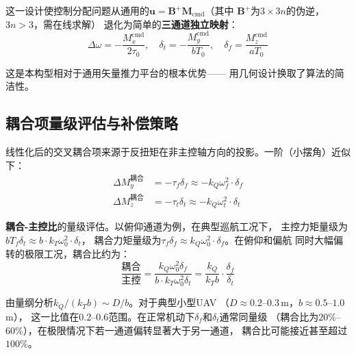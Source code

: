 \documentclass[a4paper,12pt]{ctexart}
\theoremstyle{plain}
\theoremstyle{definition}
\begin{document}
这一设计使控制分配问题从通用的$\bm{u} = \bm{B}^+ \bm{M}_{\text{cmd}}$（其中
$\bm{B}^+$为$3 \times 3n$的伪逆，$3n > 3$，需在线求解）
退化为简单的\textbf{三通道独立映射}：
\begin{equation}
    \Delta\omega = -\frac{M_x^{\text{cmd}}}{2\tau_0}, \quad
    \delta_t = -\frac{M_y^{\text{cmd}}}{b T_0}, \quad
    \delta_f = \frac{M_z^{\text{cmd}}}{a T_0}
    \label{eq:direct_mapping}
\end{equation}

这是本构型相对于通用矢量推力平台的根本优势——
用几何设计换取了算法的简洁性\cite{johansen2013control,oppenheimer2010control}。

\subsection{耦合项量级评估与补偿策略}

线性化后的交叉耦合项来源于反扭矩在非主控轴方向的投影。一阶（小摆角）近似下：
\begin{align}
    \Delta M_y^{\text{耦合}} &= -\tau_f \delta_f
    \approx -k_Q \omega_f^2 \cdot \delta_f
    \label{eq:coupling_pitch} \\
    \Delta M_z^{\text{耦合}} &= -\tau_t \delta_t
    \approx -k_Q \omega_t^2 \cdot \delta_t
    \label{eq:coupling_yaw}
\end{align}

\textbf{耦合-主控比}的量级评估。以俯仰通道为例，在典型巡航工况下，
主控力矩量级为$b T_f \delta_t \approx b \cdot k_T \omega_0^2 \cdot \delta_t$，
耦合力矩量级为$\tau_f \delta_f \approx k_Q \omega_0^2 \cdot \delta_f$。在俯仰和偏航
同时大幅偏转的极限工况，耦合比约为：
\begin{equation}
    \frac{\text{耦合}}{\text{主控}}
    = \frac{k_Q \omega_0^2 \delta_f}{b \cdot k_T \omega_0^2 \delta_t}
    = \frac{k_Q}{k_T b} \cdot \frac{\delta_f}{\delta_t}
    \label{eq:coupling_ratio}
\end{equation}

由量纲分析$k_Q / (k_T b) \sim D / b$。对于典型小型UAV
（$D \approx 0.2$--$0.3$\,m，$b \approx 0.5$--$1.0$\,m），
这一比值在$0.2$--$0.6$范围。在正常机动下$\delta_f$和$\delta_t$通常同量级
（耦合比为$20\%$--$60\%$），在极限情况下若一通道偏转显著大于另一通道，
耦合比可能接近甚至超过$100\%$。
\end{document}

